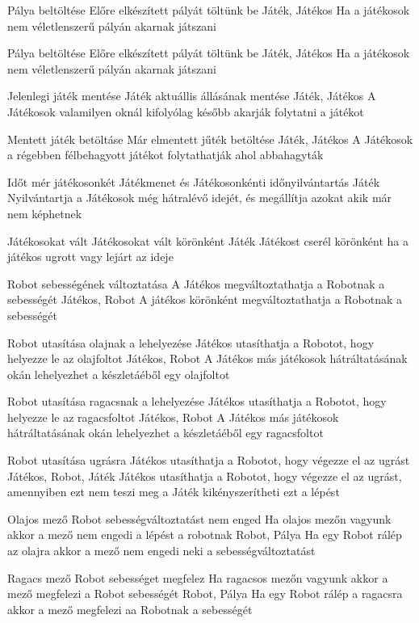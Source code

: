 \usecase%
{Pálya beltöltése}%
{Előre elkészített pályát töltünk be}%
{Játék, Játékos}%
{Ha a játékosok nem véletlenszerű pályán akarnak játszani}

\usecase%
{Pálya beltöltése}%
{Előre elkészített pályát töltünk be}%
{Játék, Játékos}%
{Ha a játékosok nem véletlenszerű pályán akarnak játszani}

\usecase%
{Jelenlegi játék mentése}%
{Játék aktuállis állásának mentése}%
{Játék, Játékos}%
{A Játékosok valamilyen oknál kifolyólag később akarják folytatni a játékot}

\usecase%
{Mentett játék betöltáse}%
{Már elmentett jűték betöltése}%
{Játék, Játékos}%
{A Játékosok a régebben félbehagyott játékot folytathatják ahol abbahagyták}

\usecase%
{Időt mér játékosonkét}%
{Játékmenet és Játékosonkénti időnyilvántartás}%
{Játék}%
{Nyilvántartja a Játékosok még hátralévő idejét, és megállítja azokat akik már nem képhetnek}

\usecase%
{Játékosokat vált}%
{Játékosokat vált körönként}%
{Játék}%
{Játékost cserél körönként ha a játékos ugrott vagy lejárt az ideje}

\usecase%
{Robot sebességének változtatása}%
{A Játékos megváltoztathatja a Robotnak a sebességét}%
{Játékos, Robot}%
{A játékos körönként megváltoztathatja a Robotnak a sebességét}

\usecase%
{Robot utasítása olajnak a lehelyezése}%
{Játékos utasíthatja a Robotot, hogy helyezze le az olajfoltot}%
{Játékos, Robot}%
{A Játékos más játékosok hátráltatásának okán lehelyezhet a készletáéből egy olajfoltot}

\usecase%
{Robot utasítása ragacsnak a lehelyezése}%
{Játékos utasíthatja a Robotot, hogy helyezze le az ragacsfoltot}%
{Játékos, Robot}%
{A Játékos más játékosok hátráltatásának okán lehelyezhet a készletáéből egy ragacsfoltot}

\usecase%
{Robot utasítása ugrásra}%
{Játékos utasíthatja a Robotot, hogy végezze el az ugrást}%
{Játékos, Robot, Játék}%
{Játékos utasíthatja a Robotot, hogy végezze el az ugrást, amennyiben ezt nem teszi meg a Játék kikényszerítheti ezt a lépést}

\usecase%
{Olajos mező Robot sebességváltoztatást nem enged}%
{Ha olajos mezőn vagyunk akkor a mező nem engedi a lépést a robotnak}%
{Robot, Pálya}%
{Ha egy Robot rálép az olajra akkor a mező nem engedi neki a sebességváltoztatást}

\usecase%
{Ragacs mező Robot sebességet megfelez}%
{Ha ragacsos mezőn vagyunk akkor a mező megfelezi a Robot sebességét}%
{Robot, Pálya}%
{Ha egy Robot rálép a ragacsra akkor a mező megfelezi aa Robotnak a sebességét}

